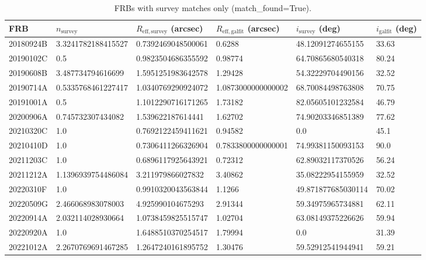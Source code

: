 ﻿\begin{table}[h!]
    \centering
    \small
    \begin{tabular}{llllll}
    \hline
    FRB & $n_{\mathrm{survey}}$ & $R_{\mathrm{eff,survey}}$ (arcsec) & $R_{\mathrm{eff,galfit}}$ (arcsec) & $i_{\mathrm{survey}}$ (deg) & $i_{\mathrm{galfit}}$ (deg) \\
    \hline
    20180924B & 3.3241782188415527 & 0.7392469048500061 & 0.6288 & 48.12091274655155 & 33.63 \\
    20190102C & 0.5 & 0.9823504686355592 & 0.98774 & 64.70865680540318 & 80.24 \\
    20190608B & 3.487734794616699 & 1.5951251983642578 & 1.29428 & 54.32229704490156 & 32.52 \\
    20190714A & 0.5335768461227417 & 1.0340769290924072 & 1.0873000000000002 & 68.70084498763808 & 70.75 \\
    20191001A & 0.5 & 1.1012290716171265 & 1.73182 & 82.05605101232584 & 46.79 \\
    20200906A & 0.745732307434082 & 1.539622187614441 & 1.62702 & 74.90203346851389 & 77.62 \\
    20210320C & 1.0 & 0.7692122459411621 & 0.94582 & 0.0 & 45.1 \\
    20210410D & 1.0 & 0.7306411266326904 & 0.7833800000000001 & 74.99381150093153 & 90.0 \\
    20211203C & 1.0 & 0.6896117925643921 & 0.72312 & 62.89032117370526 & 56.24 \\
    20211212A & 1.1396939754486084 & 3.211979866027832 & 3.40862 & 35.08222954155959 & 32.52 \\
    20220310F & 1.0 & 0.9910320043563844 & 1.1266 & 49.871877685030114 & 70.02 \\
    20220509G & 2.466068983078003 & 4.925990104675293 & 2.91344 & 59.34975965734881 & 62.11 \\
    20220914A & 2.032114028930664 & 1.0738459825515747 & 1.02704 & 63.08149375226626 & 59.94 \\
    20220920A & 1.0 & 1.6488510370254517 & 1.79994 & 0.0 & 31.39 \\
    20221012A & 2.2670769691467285 & 1.2647240161895752 & 1.30476 & 59.52912541944941 & 59.21 \\
    \hline
    \end{tabular}
    \caption{FRBs with survey matches only (match\_found=True).}
\end{table}
